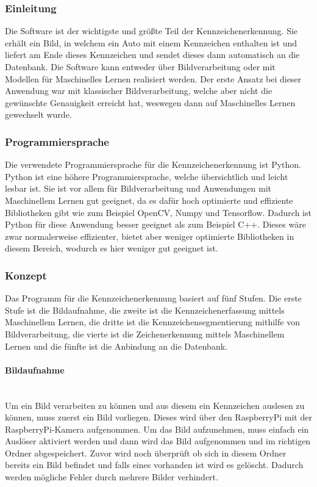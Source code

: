 \subsubsection{Einleitung}
Die Software ist der wichtigste und größte Teil der Kennzeichenerkennung. Sie erhält ein Bild, in welchem ein Auto mit 
einem Kennzeichen enthalten ist und liefert am Ende dieses Kennzeichen und sendet dieses dann automatisch an die Datenbank. 
Die Software kann entweder über Bildverarbeitung oder mit Modellen für Maschinelles Lernen realisiert werden. Der erste Ansatz bei 
dieser Anwendung war mit klassischer Bildverarbeitung, welche aber nicht die gewünschte Genauigkeit erreicht hat, weswegen 
dann auf Maschinelles Lernen gewechselt wurde.

\subsubsection{Programmiersprache}
Die verwendete Programmiersprache für die Kennzeichenerkennung ist Python. Python ist eine höhere Programmiersprache, 
welche übersichtlich und leicht lesbar ist. Sie ist vor allem für Bildverarbeitung und Anwendungen mit Maschinellem Lernen gut geeignet, 
da es dafür hoch optimierte und effiziente Bibliotheken gibt wie zum Beispiel OpenCV, Numpy und Tensorflow. Dadurch ist Python 
für diese Anwendung besser geeignet als zum Beispiel C++. Dieses wäre zwar normalerweise effizienter, bietet aber weniger 
optimierte Bibliotheken in diesem Bereich, wodurch es hier weniger gut geeignet ist.

\subsubsection{Konzept}
Das Programm für die Kennzeichenerkennung basiert auf fünf Stufen. Die erste Stufe ist die Bildaufnahme, die zweite ist die 
Kennzeichenerfassung mittels Maschinellem Lernen, die dritte ist die Kennzeichensegmentierung mithilfe von Bildverarbeitung, 
die vierte ist die Zeichenerkennung mittels Maschinellem Lernen und die fünfte ist die Anbindung an die Datenbank.

\paragraph{Bildaufnahme}\mbox{}\\
Um ein Bild verarbeiten zu können und aus diesem ein Kennzeichen auslesen zu können, muss zuerst ein Bild vorliegen. 
Dieses wird über den RaspberryPi mit der RaspberryPi-Kamera aufgenommen. Um das Bild aufzunehmen, muss einfach ein Auslöser 
aktiviert werden und dann wird das Bild aufgenommen und im richtigen Ordner abgespeichert. Zuvor wird noch überprüft ob 
sich in diesem Ordner bereits ein Bild befindet und falls eines vorhanden ist wird es gelöscht. Dadurch werden mögliche Fehler 
durch mehrere Bilder verhindert.

